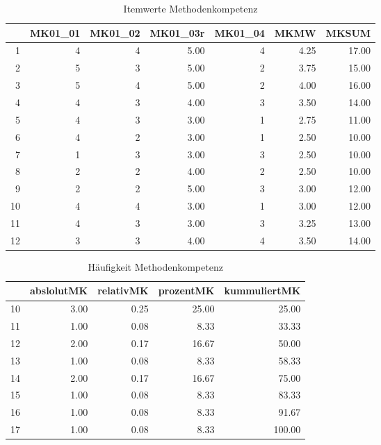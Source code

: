 \begin{table}[ht]
  \caption{Itemwerte Methodenkompetenz}
\centering
\begin{tabular}{rrrrrrr}
  \hline
 & MK01\_01 & MK01\_02 & MK01\_03r & MK01\_04 & MKMW & MKSUM \\
  \hline
1 &   4 &   4 & 5.00 &   4 & 4.25 & 17.00 \\
  2 &   5 &   3 & 5.00 &   2 & 3.75 & 15.00 \\
  3 &   5 &   4 & 5.00 &   2 & 4.00 & 16.00 \\
  4 &   4 &   3 & 4.00 &   3 & 3.50 & 14.00 \\
  5 &   4 &   3 & 3.00 &   1 & 2.75 & 11.00 \\
  6 &   4 &   2 & 3.00 &   1 & 2.50 & 10.00 \\
  7 &   1 &   3 & 3.00 &   3 & 2.50 & 10.00 \\
  8 &   2 &   2 & 4.00 &   2 & 2.50 & 10.00 \\
  9 &   2 &   2 & 5.00 &   3 & 3.00 & 12.00 \\
  10 &   4 &   4 & 3.00 &   1 & 3.00 & 12.00 \\
  11 &   4 &   3 & 3.00 &   3 & 3.25 & 13.00 \\
  12 &   3 &   3 & 4.00 &   4 & 3.50 & 14.00 \\
   \hline
\end{tabular}
\end{table}



\begin{table}[ht]
\centering
\caption{Häufigkeit Methodenkompetenz}
\begin{tabular}{rrrrr}
  \hline
 & abslolutMK & relativMK & prozentMK & kummuliertMK \\ 
  \hline
10 & 3.00 & 0.25 & 25.00 & 25.00 \\
  11 & 1.00 & 0.08 & 8.33 & 33.33 \\
  12 & 2.00 & 0.17 & 16.67 & 50.00 \\
  13 & 1.00 & 0.08 & 8.33 & 58.33 \\
  14 & 2.00 & 0.17 & 16.67 & 75.00 \\
  15 & 1.00 & 0.08 & 8.33 & 83.33 \\
  16 & 1.00 & 0.08 & 8.33 & 91.67 \\
  17 & 1.00 & 0.08 & 8.33 & 100.00 \\
   \hline
\end{tabular}
\end{table}
